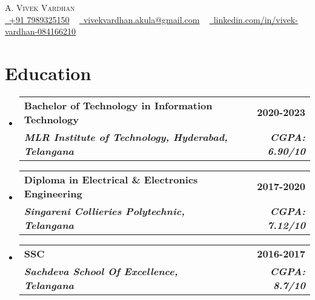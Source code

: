 \documentclass[letterpaper,11pt]{article}
\makeatletter
\newcommand{\resumeSubheading}[4]{
  \vspace{-2pt}\item
    \begin{tabular*}{1.0\textwidth}[t]{l@{\extracolsep{\fill}}r}
      \textbf{#1} & \textbf{\small #2} \\
      \textit{\small#3} & \textit{\small #4} \\
    \end{tabular*}\vspace{-7pt}
}
\newcommand{\resumeSubHeadingListStart}{\begin{itemize}[leftmargin=0.0in, label={}]}
\newcommand{\resumeSubHeadingListEnd}{\end{itemize}}
\makeatother
\begin{document}
\begin{center}
    {\Huge \scshape A. Vivek Vardhan} \\ \vspace{1pt}
    \small 
    \href{tel:917989325150}{\raisebox{-0.1\height}\faPhone\  +91 7989325150} ~ \href{mailto:vivekvardhan.akula@gmail.com}{\raisebox{-0.2\height}\faEnvelope\  \underline{vivekvardhan.akula@gmail.com}} ~ 
    \href{https://www.linkedin.com/in/vivek-vardhan-084166210/}{\raisebox{-0.2\height}\faLinkedin\ \underline{linkedin.com/in/vivek-vardhan-084166210}}  ~
    \vspace{-6pt}
\end{center}




\section{Education}
  \resumeSubHeadingListStart
    \resumeSubheading
      {\textbf{Bachelor of Technology in Information Technology}}{\textbf{2020-2023}}
      {\textbf{MLR Institute of Technology, Hyderabad, Telangana}}{\textbf{CGPA: 6.90/10}}
    \resumeSubheading
      {\textbf{Diploma in Electrical \& Electronics Engineering}}{\textbf{2017-2020}}
      {\textbf{Singareni Collieries Polytechnic, Telangana}}{\textbf{CGPA: 7.12/10}}
    \resumeSubheading
      {\textbf{SSC}}{\textbf{2016-2017}}
      {\textbf{Sachdeva School Of Excellence, Telangana}}{\textbf{CGPA: 8.7/10}}
  \resumeSubHeadingListEnd
\end{document}
